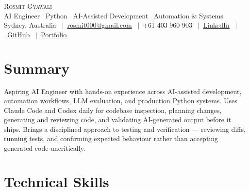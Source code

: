 \documentclass[a4paper,11pt]{article}
\begin{document}

\begin{center}
    {\LARGE \scshape Rosmit Gyawali} \\ \vspace{2pt}
    \small
    AI Engineer \textbullet\ Python \textbullet\ AI-Assisted Development \textbullet\ Automation \& Systems
    \\ \vspace{3pt}
    Sydney, Australia
    \ $|$\ \href{mailto:rosmit000@gmail.com}{rosmit000@gmail.com}
    \ $|$\ +61 403 960 903
    \ $|$\ \href{https://linkedin.com/in/rosmitg}{LinkedIn}
    \ $|$\ \href{https://github.com/rosmitg}{GitHub}
    \ $|$\ \href{https://rosmit.com.au}{Portfolio}
\end{center}

\vspace{-9pt}


\section{Summary}

\small{
Aspiring AI Engineer with hands-on experience across AI-assisted development,
automation workflows, LLM evaluation, and production Python systems. Uses Claude
Code and Codex daily for codebase inspection, planning changes, generating and
reviewing code, and validating AI-generated output before it ships. Brings a
disciplined approach to testing and verification — reviewing diffs, running tests,
and confirming expected behaviour rather than accepting generated code uncritically.
}

\vspace{-2pt}


\section{Technical Skills}
\end{document}
